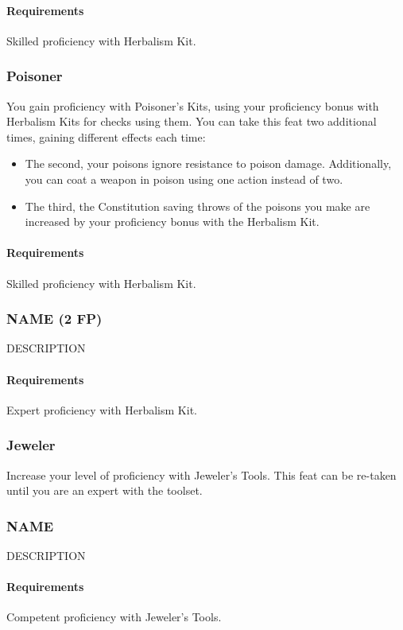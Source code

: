     \paragraph{Requirements} Skilled proficiency with Herbalism Kit.
\subsubsection{Poisoner} \label{feat::poisoner}
    You gain proficiency with Poisoner's Kits, using your proficiency bonus with Herbalism Kits for checks using them.
    You can take this feat two additional times, gaining different effects each time:
    \begin{itemize}
        \item The second, your poisons ignore resistance to poison damage.
        Additionally, you can coat a weapon in poison using one action instead of two.
        \item The third, the Constitution saving throws of the poisons you make are increased by your proficiency bonus with the Herbalism Kit.
    \end{itemize}
    \paragraph{Requirements} Skilled proficiency with Herbalism Kit.
\subsubsection{NAME (2 FP)} \label{feat::name}
    DESCRIPTION
    \paragraph{Requirements} Expert proficiency with Herbalism Kit.
\subsubsection{Jeweler} \label{feat::jeweler}
    Increase your level of proficiency with Jeweler's Tools.
    This feat can be re-taken until you are an expert with the toolset.
\subsubsection{NAME} \label{feat::name}
    DESCRIPTION
    \paragraph{Requirements} Competent proficiency with Jeweler's Tools.
